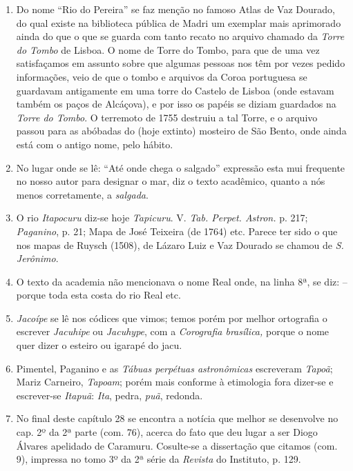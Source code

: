 \begin{enumerate}
\item Do nome ``Rio do Pereira'' se faz menção no famoso Atlas de Vaz Dourado, do qual 
existe na biblioteca pública de Madri um exemplar mais aprimorado ainda do que o que 
se guarda com tanto recato no arquivo chamado da \textit{Torre do Tombo} de Lisboa. O nome 
de Torre do Tombo, para que de uma vez satisfaçamos em assunto sobre que algumas 
pessoas nos têm por vezes pedido informações, veio de que o tombo e arquivos da 
Coroa portuguesa se guardavam antigamente em uma torre do Castelo de Lisboa 
(onde estavam também os paços de Alcáçova), e por isso os papéis se diziam guardados na \textit{Torre 
do Tombo}. O terremoto de 1755 destruiu a tal Torre, e o arquivo passou para as abóbadas do 
(hoje extinto) mosteiro de São Bento, onde ainda está com o antigo nome, pelo hábito.

\item No lugar onde se lê: ``Até onde chega o salgado''  expressão esta mui frequente no 
nosso autor para designar o mar, diz o texto acadêmico, quanto a nós menos 
corretamente, a \textit{salgada}.

\item O rio \textit{Itapocuru} diz-se hoje \textit{Tapicuru}. V. \textit{Tab. Perpet. Astron.} p. 217; \textit{Paganino}, p. 
21; Mapa de José Teixeira (de 1764) etc. Parece ter sido o que nos mapas de Ruysch 
(1508), de Lázaro Luiz e Vaz Dourado se chamou de \textit{S. Jerônimo}.

\item O texto da academia não mencionava o nome Real onde, na linha 8ª, se diz: -- porque toda esta costa do rio Real etc.

\item  \textit{Jacoípe} se lê nos códices que vimos; temos porém por melhor ortografia o escrever 
\textit{Jacuhipe} ou \textit{Jacuhype}, com a \textit{Corografia brasílica,} porque o nome quer dizer o esteiro ou igarapé do jacu.

\item Pimentel, Paganino e as \textit{Tábuas perpétuas astronômicas} escreveram \textit{Tapoã}; Mariz 
Carneiro, \textit{Tapoam}; porém mais conforme à etimologia fora dizer-se e escrever-se 
\textit{Itapuã}: \textit{Ita}, pedra, \textit{puã}, redonda.

\item No final deste capítulo 28 se encontra a notícia que melhor se desenvolve no cap. 
2º da 2ª parte (com. 76), acerca do fato que deu lugar a ser Diogo Álvares apelidado 
de Caramuru. Cosulte-se a dissertação que citamos (com. 9), impressa no tomo 3º da 
2ª série da \textit{Revista} do Instituto, p. 129.


\end{enumerate}
